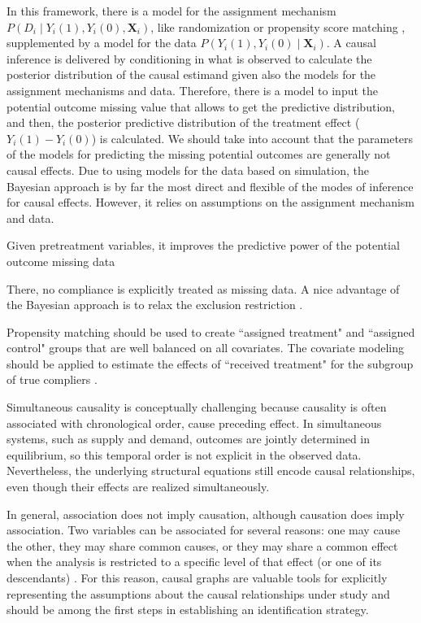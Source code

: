 In this framework, there is a model for the assignment mechanism $P(D_i\mid Y_i(1), Y_i(0), \mathbf{X}_i)$, like randomization or propensity score matching \cite{rosenbaum1983central}, supplemented by a model for the data $P(Y_i(1), Y_i(0)\mid \mathbf{X}_i)$. A causal inference is delivered by conditioning in what is observed to calculate the posterior distribution of the causal estimand given also the models for the assignment mechanisms and data. Therefore, there is a model to input the potential outcome missing value that allows to get the predictive distribution, and then, the posterior predictive distribution of the treatment effect ($Y_i(1)-Y_i(0)$) is calculated. We should take into account that the parameters of the models for predicting the missing potential outcomes are generally not causal effects. Due to using models for the data based on simulation, the Bayesian approach is by far the most direct and flexible of the modes of inference for causal effects. However, it relies on assumptions on the assignment mechanism and data.

Given pretreatment variables, it improves the predictive power of the potential outcome missing data



There, no compliance is explicitly treated as missing data. A nice advantage of the Bayesian approach is to relax the exclusion restriction \cite{rubin2004teaching}.

Propensity matching should be used to create ``assigned treatment" and ``assigned control" groups that are well balanced on all covariates. The covariate modeling should be applied to estimate the effects of ``received treatment" for the subgroup of true compliers \cite{rubin2004teaching}.

Simultaneous causality is conceptually challenging because causality is often associated with chronological order, cause preceding effect. In simultaneous systems, such as supply and demand, outcomes are jointly determined in equilibrium, so this temporal order is not explicit in the observed data. Nevertheless, the underlying structural equations still encode causal relationships, even though their effects are realized simultaneously.

In general, association does not imply causation, although causation does imply association. Two variables can be associated for several reasons: one may cause the other, they may share common causes, or they may share a common effect when the analysis is restricted to a specific level of that effect (or one of its descendants) \cite{hernan2020causal}. For this reason, causal graphs are valuable tools for explicitly representing the assumptions about the causal relationships under study and should be among the first steps in establishing an identification strategy.

